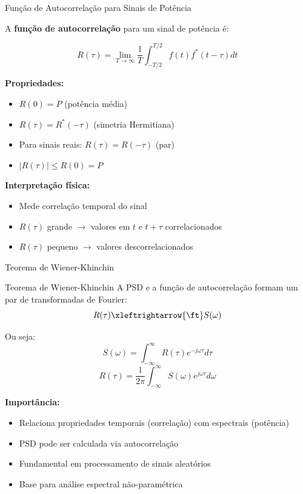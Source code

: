 \begin{frame}{Função de Autocorrelação para Sinais de Potência}

A \textbf{função de autocorrelação} para um sinal de potência é:

\[
R(\tau) = \lim_{T \to \infty} \frac{1}{T} \int_{-T/2}^{T/2} f(t) f^*(t - \tau) dt
\]

\textbf{Propriedades:}

\begin{itemize}
\item $R(0) = P$ (potência média)
\item $R(\tau) = R^*(-\tau)$ (simetria Hermitiana)
\item Para sinais reais: $R(\tau) = R(-\tau)$ (par)
\item $|R(\tau)| \leq R(0) = P$
\end{itemize}

\vspace{0.1cm}

\textbf{Interpretação física:}

\begin{itemize}
\item Mede correlação temporal do sinal
\item $R(\tau)$ grande $\rightarrow$ valores em $t$ e $t+\tau$ correlacionados
\item $R(\tau)$ pequeno $\rightarrow$ valores descorrelacionados
\end{itemize}

\end{frame}


\begin{frame}{Teorema de Wiener-Khinchin}

\begin{block}{Teorema de Wiener-Khinchin}
A PSD e a função de autocorrelação formam um par de transformadas de Fourier:
\[
R(\tau) \xleftrightarrow{\ft} S(\omega)
\]

Ou seja:
\[
S(\omega) = \int_{-\infty}^{\infty} R(\tau) e^{-j\omega\tau} d\tau
\]
\[
R(\tau) = \frac{1}{2\pi} \int_{-\infty}^{\infty} S(\omega) e^{j\omega\tau} d\omega
\]
\end{block}

\textbf{Importância:}

\begin{itemize}
\item Relaciona propriedades temporais (correlação) com espectrais (potência)
\item PSD pode ser calculada via autocorrelação
\item Fundamental em processamento de sinais aleatórios
\item Base para análise espectral não-paramétrica
\end{itemize}

\end{frame}

